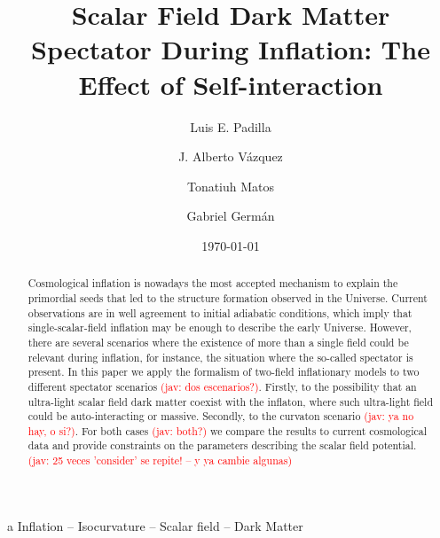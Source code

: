 \documentclass[amssymb,twocolumn,prd,nofootinbib,showpacs]{revtex4-1}
\newcommand{\jav}[1]{\textcolor{red}{(jav: #1)}}
\begin{document}
\title{Scalar Field Dark Matter Spectator During Inflation: The Effect of Self-interaction}
\author{Luis E. Padilla}  
   \author{J. Alberto V\'azquez}  
\author{Tonatiuh Matos}  
   \author{Gabriel Germ\'an}  

\date{\today}

\begin{abstract}
Cosmological inflation is nowadays the most accepted mechanism to explain the  primordial seeds 
that led to  the structure formation observed in the Universe. Current observations are in well agreement 
to initial adiabatic conditions, which imply that  single-scalar-field inflation may be enough to describe 
the early Universe. 
%
However, there are several scenarios where the existence of more than a single field could be relevant during inflation,
for instance, the situation where the so-called spectator is present. 
In this paper we apply the formalism of two-field inflationary models to two different 
spectator scenarios \jav{dos escenarios?}. Firstly, to the possibility that an ultra-light scalar field dark matter coexist with the inflaton, 
where such ultra-light field could be auto-interacting or massive. Secondly, to the curvaton scenario \jav{ya no hay, o si?}.
For both cases \jav{both?} we compare the results to current cosmological data and provide constraints on the parameters
describing the scalar field potential.    \jav{25 veces 'consider' se repite! -- y ya cambie algunas}
\end{abstract}
\begin{keywords}
a Inflation  --  Isocurvature  --  Scalar field -- Dark Matter
\end{keywords}
\end{document}
